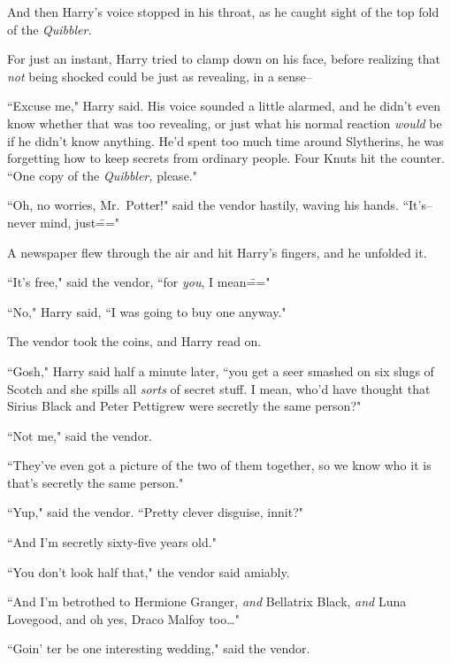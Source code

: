 And then Harry's voice stopped in his throat, as he caught sight of the top fold of the \emph{Quibbler.}


For just an instant, Harry tried to clamp down on his face, before realizing that \emph{not} being shocked could be just as revealing, in a sense\---

``Excuse me," Harry said. His voice sounded a little alarmed, and he didn't even know whether that was too revealing, or just what his normal reaction \emph{would} be if he didn't know anything. He'd spent too much time around Slytherins, he was forgetting how to keep secrets from ordinary people. Four Knuts hit the counter. ``One copy of the \emph{Quibbler,} please."

``Oh, no worries, Mr.~Potter!" said the vendor hastily, waving his hands. ``It's\---never mind, just\==="

A newspaper flew through the air and hit Harry's fingers, and he unfolded it.


``It's free," said the vendor, ``for \emph{you}, I mean\==="

``No," Harry said, ``I was going to buy one anyway."

The vendor took the coins, and Harry read on.

``Gosh," Harry said half a minute later, ``you get a seer smashed on six slugs of Scotch and she spills all \emph{sorts} of secret stuff. I mean, who'd have thought that Sirius Black and Peter Pettigrew were secretly the same person?"

``Not me," said the vendor.

``They've even got a picture of the two of them together, so we know who it is that's secretly the same person."

``Yup," said the vendor. ``Pretty clever disguise, innit?"

``And I'm secretly sixty-five years old."

``You don't look half that," the vendor said amiably.

``And I'm betrothed to Hermione Granger, \emph{and} Bellatrix Black, \emph{and} Luna Lovegood, and oh yes, Draco Malfoy too{\ldots}"

``Goin' ter be one interesting wedding," said the vendor.

